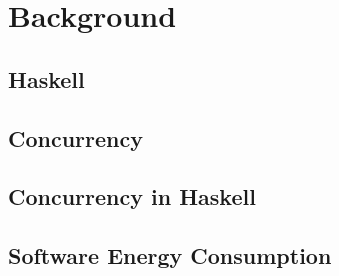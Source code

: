 \chapter{Background}

\section{Haskell}
\lipsum[1-4]


\section{Concurrency}
\lipsum[2-4]


\section{Concurrency in Haskell}
\lipsum[1-4]


\section{Software Energy Consumption}
\lipsum[1-4]
